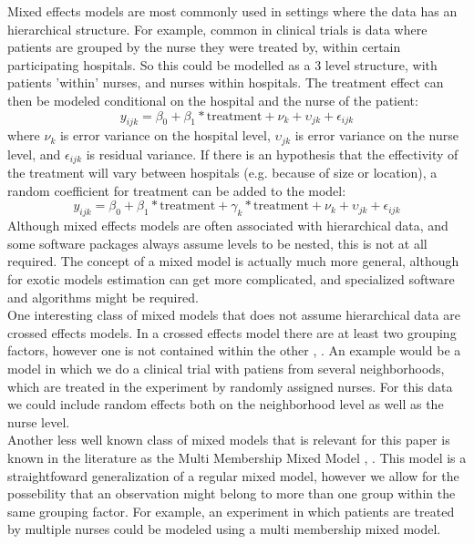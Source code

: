 \documentclass[a4paper]{article}
\begin{document}
Mixed effects models are most commonly used in settings where the data has an hierarchical structure. For example, common in clinical trials is data where patients are grouped
by the nurse they were treated by, within certain participating hospitals. So this could be modelled as a  3 level structure, with patients 'within' nurses, and nurses within hospitals.
The treatment effect can then be modeled conditional on the hospital and the nurse of the patient:
$$
y_{ijk} = \beta_0 + \beta_1 * \mathrm{treatment} + \nu_k + \upsilon_{jk} + \epsilon_{ijk}
$$
where $\nu_k$ is error variance on the hospital level, $\upsilon_{jk}$ is error variance on the nurse level, and $\epsilon_{ijk}$ is residual variance. If there is an
hypothesis that the effectivity of the treatment will vary between hospitals (e.g. because of size or location), a random coefficient for treatment can be added to the model:
$$
y_{ijk} = \beta_0 + \beta_1 * \mathrm{treatment} + \gamma_{k} * \mathrm{treatment} + \nu_k + \upsilon_{jk} + \epsilon_{ijk}
$$
Although mixed effects models are often associated with hierarchical data, and some software packages always assume levels to be nested, this 
is not at all required. The concept of a mixed model is actually much more general, although for exotic models estimation can get
more complicated, and specialized software and algorithms might be required. \\

One interesting class of mixed models that does not assume hierarchical data are crossed effects models. In a crossed effects model there are at least two
grouping factors, however one is not contained within the other \citep[chapter. 8.2]{de2008handbook}, \citep{browne2001multiple, rasbash1994efficient}. 
An example would be a model in which we do a clinical trial with patiens from several neighborhoods,
which are treated in the experiment by randomly assigned nurses. For this data we could include random effects both on the neighborhood level as well as the
nurse level. \\

Another less well known class of mixed models that is relevant for this paper is known in the literature as the Multi Membership Mixed Model \citep[chapter. 8.3]{de2008handbook}, \citep{browne2001multiple}. 
This model is a straightfoward generalization of a regular mixed model, however we allow for the possebility that an observation might belong to more than one group within the same 
grouping factor. For example, an experiment in which patients are treated by multiple nurses could be modeled using a multi membership mixed model.
\end{document}
